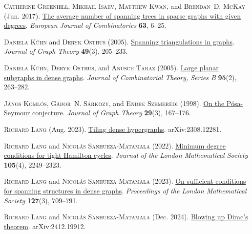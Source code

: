 \documentclass[12pt,reqno]{amsart}
\theoremstyle{plain}
\theoremstyle{definition}
\numberwithin{equation}{section}
\begin{document}
{\begin{thebibliography}{GHMN22}
			\textsc{Catherine Greenhill}, \textsc{Mikhail Isaev}, \textsc{Matthew Kwan}, and \textsc{Brendan~D. McKay} (Jun. 2017).
			\newblock \href{https://doi.org/10.1016/j.ejc.2017.02.003}{The average number of spanning trees in sparse graphs with given degrees}.
			\newblock \emph{European Journal of Combinatorics} \textbf{63}, 6--25.
			
			\textsc{Daniela K{\"u}hn} and \textsc{Deryk Osthus} (2005).
			\newblock \href{https://doi.org/10.1002/jgt.20076}{Spanning triangulations in graphs}.
			\newblock \emph{Journal of Graph Theory} \textbf{49}(3), 205--233.
			
			\textsc{Daniela K\"{u}hn}, \textsc{Deryk Osthus}, and \textsc{Anusch Taraz} (2005).
			\newblock \href{https://doi.org/10.1016/j.jctb.2005.04.004}{Large planar subgraphs in dense graphs}.
			\newblock \emph{Journal of Combinatorial Theory, Series B} \textbf{95}(2), 263--282.
			
			\textsc{J\'anos Koml\'{o}s}, \textsc{G\'abor~N. S\'{a}rk\"{o}zy}, and \textsc{Endre Szemer{\'e}di} (1998).
			\newblock \href{https://doi.org/10.1002/(SICI)1097-0118(199811)29:3<167::AID-JGT4>3.0.CO;2-O}{On the {P}\'{o}sa-{S}eymour conjecture}.
			\newblock \emph{Journal of Graph Theory} \textbf{29}(3), 167--176.
			
			\textsc{Richard Lang} (Aug. 2023).
			\newblock \href{http://arxiv.org/abs/2308.12281}{Tiling dense hypergraphs}.
			\newblock arXiv:2308.12281.
			
			\textsc{Richard Lang} and \textsc{Nicol\'{a}s Sanhueza-Matamala} (2022).
			\newblock \href{https://doi.org/10.1112/jlms.12561}{Minimum degree conditions for tight {H}amilton cycles}.
			\newblock \emph{Journal of the London Mathematical Society} \textbf{105}(4), 2249--2323.
			
			\textsc{Richard Lang} and \textsc{Nicol\'{a}s Sanhueza-Matamala} (2023).
			\newblock \href{https://doi.org/10.1112/plms.12552}{On sufficient conditions for spanning structures in dense graphs}.
			\newblock \emph{Proceedings of the London Mathematical Society} \textbf{127}(3), 709--791.
			
			\textsc{Richard Lang} and \textsc{Nicol\'{a}s Sanhueza-Matamala} (Dec. 2024).
			\newblock \href{http://arxiv.org/abs/2412.19912}{Blowing up {D}irac's theorem}.
			\newblock arXiv:2412.19912.
			

\end{thebibliography}}
\end{document}
